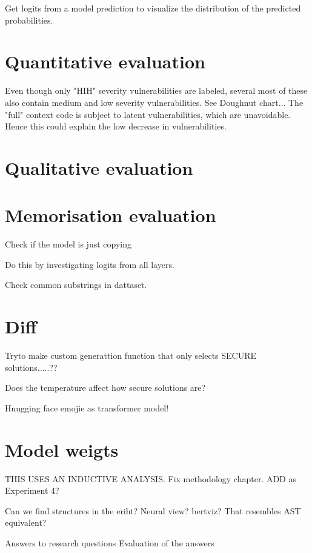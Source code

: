 Get logits from a model  prediction to visualize the distribution of the predicted probabilities.

\section{Quantitative evaluation}

Even though only "HIH" severity vulnerabilities are labeled, several most of these also contain medium and low severity vulnerabilities. See Doughnut chart...  
The "full" context code is subject to latent vulnerabilities, which are unavoidable. Hence this could explain the low decrease in vulnerabilities.




\section{Qualitative evaluation}


\section{Memorisation evaluation}
Check if the model is just copying

Do this by investigating logits from  all layers.

Check common substrings in dattaset.

\section{Diff}

Tryto make custom generattion function that only selects SECURE solutions.....??

Does the temperature affect how secure solutions are?


Huugging face emojie as transformer model!


\section{Model weigts}
THIS USES AN INDUCTIVE ANALYSIS. Fix methodology chapter. ADD as Experiment 4?

Can  we  find structures in the eriht? Neural  view? bertviz? That resembles AST equivalent?

Answers to research questions
Evaluation of the answers
